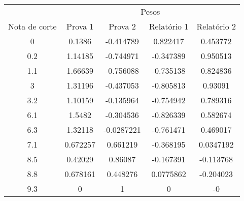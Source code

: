\begin{tabular}{c cccc}
        \hline
                      & \multicolumn{4}{c}{Pesos}\\ \cline{2-5}
        Nota de corte & Prova 1  & Prova 2 & Relatório 1
        & Relatório 2 \\
        \hline
        0    & 0.1386   & -0.414789  & 0.822417  & 0.453772  \\
        0.2  & 1.14185  & -0.744971  & -0.347389 & 0.950513  \\
        1.1  & 1.66639  & -0.756088  & -0.735138 & 0.824836  \\
        3    & 1.31196  & -0.437053  & -0.805813 & 0.93091   \\
        3.2  & 1.10159  & -0.135964  & -0.754942 & 0.789316  \\
        6.1  & 1.5482   & -0.304536  & -0.826339 & 0.582674  \\
        6.3  & 1.32118  & -0.0287221 & -0.761471 & 0.469017  \\
        7.1  & 0.672257 & 0.661219   & -0.368195 & 0.0347192 \\
        8.5  & 0.42029  & 0.86087    & -0.167391 & -0.113768 \\
        8.8  & 0.678161 & 0.448276   & 0.0775862 & -0.204023 \\
        9.3  & 0        & 1          & 0         & -0        \\
        \hline
\end{tabular}
